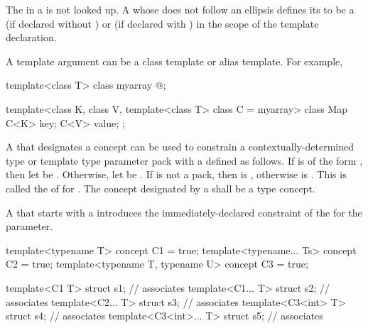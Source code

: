 \pnum
The  in a  is not looked up.
A 
whose  does not follow an ellipsis
defines its
to be a
(if declared without
)
or
(if declared with
)
in the scope of the template declaration.
\begin{note}
A template argument can be a class template or alias template.
For example,

\begin{codeblock}
template<class T> class myarray { @\commentellip@ };

template<class K, class V, template<class T> class C = myarray>
class Map {
  C<K> key;
  C<V> value;
};
\end{codeblock}
\end{note}

\pnum
A   that designates a concept 
can be used to constrain a
contextually-determined type or template type parameter pack 
with a   defined as follows.
If  is of the form ,
then let  be .
Otherwise, let  be .
If  is not a pack,
then  is ,
otherwise  is .
This   is called the
of  for .
The concept designated by a 
shall be a type concept.

\pnum
A  that starts with a 
introduces the immediately-declared constraint
of the  for the parameter.
\begin{example}
\begin{codeblock}
template<typename T> concept C1 = true;
template<typename... Ts> concept C2 = true;
template<typename T, typename U> concept C3 = true;

template<C1 T> struct s1;               // associates 
template<C1... T> struct s2;            // associates 
template<C2... T> struct s3;            // associates 
template<C3<int> T> struct s4;          // associates 
template<C3<int>... T> struct s5;       // associates 
\end{codeblock}
\end{example}

